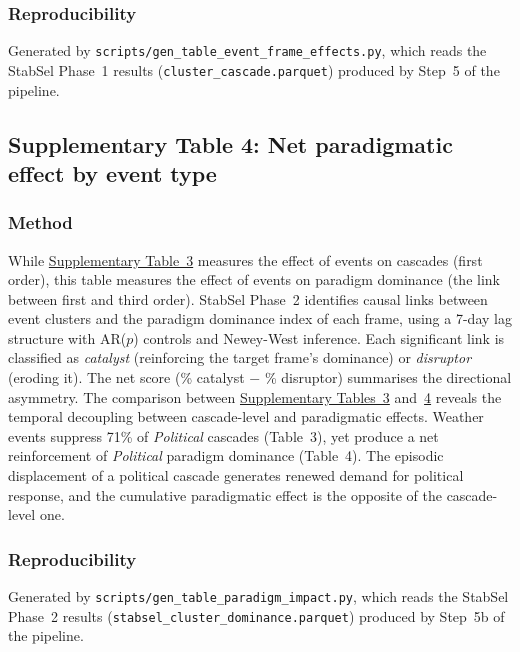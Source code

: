 \documentclass[11pt]{article}
\begin{document}
\subsubsection*{Reproducibility}
Generated by \texttt{scripts/gen\_table\_event\_frame\_effects.py}, which reads the StabSel Phase~1 results (\texttt{cluster\_cascade.parquet}) produced by Step~5 of the pipeline.


\newpage
\subsection*{Supplementary Table 4: Net paradigmatic effect by event type}



\subsubsection*{Method}
While \hyperref[tab:si_event_frame]{Supplementary Table~3} measures the effect of events on cascades (first order), this table measures the effect of events on paradigm dominance (the link between first and third order). StabSel Phase~2 identifies causal links between event clusters and the paradigm dominance index of each frame, using a 7-day lag structure with AR($p$) controls and Newey-West inference. Each significant link is classified as \emph{catalyst} (reinforcing the target frame's dominance) or \emph{disruptor} (eroding it). The net score (\% catalyst $-$ \% disruptor) summarises the directional asymmetry. The comparison between \hyperref[tab:si_event_frame]{Supplementary Tables~3} and~\hyperref[tab:si_paradigm_impact]{4} reveals the temporal decoupling between cascade-level and paradigmatic effects. Weather events suppress 71\% of \emph{Political} cascades (Table~3), yet produce a net reinforcement of \emph{Political} paradigm dominance (Table~4). The episodic displacement of a political cascade generates renewed demand for political response, and the cumulative paradigmatic effect is the opposite of the cascade-level one.

\subsubsection*{Reproducibility}
Generated by \texttt{scripts/gen\_table\_paradigm\_impact.py}, which reads the StabSel Phase~2 results (\texttt{stabsel\_cluster\_dominance.parquet}) produced by Step~5b of the pipeline.
\end{document}
